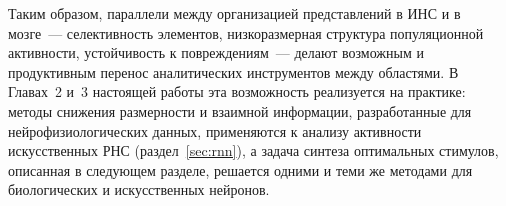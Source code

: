 Таким образом, параллели между организацией представлений в ИНС и в мозге~--- селективность элементов, низкоразмерная структура популяционной активности, устойчивость к повреждениям~--- делают возможным и продуктивным перенос аналитических инструментов между областями. В Главах~2 и~3 настоящей работы эта возможность реализуется на практике: методы снижения размерности и взаимной информации, разработанные для нейрофизиологических данных, применяются к анализу активности искусственных РНС (раздел~\ref{sec:rnn}), а задача синтеза оптимальных стимулов, описанная в следующем разделе, решается одними и теми же методами для биологических и искусственных нейронов.
